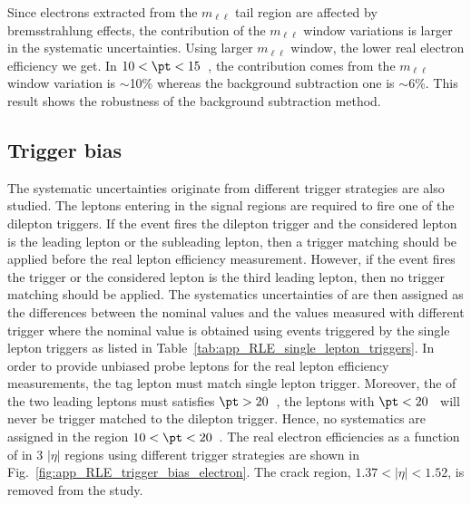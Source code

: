 Since electrons extracted from the $m_{\ell \ell}$ tail region are affected by bremsstrahlung effects, the contribution of the $m_{\ell \ell}$ window variations is larger in the systematic uncertainties.
Using larger $m_{\ell \ell}$ window, the lower real electron efficiency we get.
In $10 < \pt < 15$~{\GeV}, the contribution comes from the $m_{\ell\ell}$ window variation is $\sim$10\% whereas the background subtraction one is $\sim$6\%.
This result shows the robustness of the background subtraction method.


\subsection{Trigger bias}
\label{subsec:app_RLE_trigger_bias}
The systematic uncertainties originate from different trigger strategies are also studied.
The leptons entering in the signal regions are required to fire one of the dilepton triggers.
If the event fires the dilepton trigger and the considered lepton is the leading lepton or the subleading lepton, then a trigger matching should be applied before the real lepton efficiency measurement.
However, if the event fires the \met trigger or the considered lepton is the third leading lepton, then no trigger matching should be applied.
The systematics uncertainties of are then assigned as the differences between the nominal values and the values measured with different trigger where the nominal value is obtained using events triggered by the single lepton triggers as listed in Table~\ref{tab:app_RLE_single_lepton_triggers}.
In order to provide unbiased probe leptons for the real lepton efficiency measurements, the tag lepton must match single lepton trigger.
Moreover, the \pt of the two leading leptons must satisfies $\pt > 20$~{\GeV}, the leptons with $\pt < 20$~{\GeV} will never be trigger matched to the dilepton trigger.
Hence, no systematics are assigned in the region $10 < \pt < 20$~{\GeV}.
The real electron efficiencies as a function of \pt in 3 $|\eta|$ regions using different trigger strategies are shown in Fig.~\ref{fig:app_RLE_trigger_bias_electron}.
The crack region, $1.37<|\eta|<1.52$, is removed from the study.

